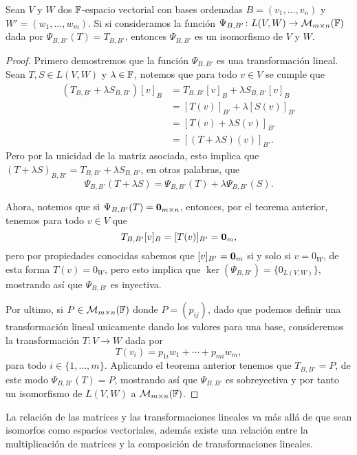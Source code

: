 \begin{teor}\label{teo:isomTrMat}
  Sean $V$ y $W$ dos $\mathbb{F}$-espacio vectorial con bases ordenadas $B = (v_1,\ldots,v_n)$ y $W' = (w_1,\ldots,w_m)$. Si si consideramos la función $\Psi_{B,B'}\colon L(V,W) \to \mathcal{M}_{m\times n}(\mathbb{F})$ dada por $\Psi_{B,B'}(T) = T_{B,B'}$, entonces $\Psi_{B,B'}$ es un isomorfismo de $V$ y $W$.
\end{teor}
\begin{proof}
  Primero demostremos que la función $\Psi_{B,B'}$ es una transformación lineal. Sean $T, S \in L(V,W)$ y $\lambda \in \mathbb{F}$, notemos que para todo $v \in V$ se cumple que
  \begin{align*}
    (T_{B,B'} + \lambda S_{B,B'})[v]_B &= T_{B,B'}[v]_B + \lambda S_{B,B'} [v]_B \\
      &= [T(v)]_{B'} + \lambda [S(v)]_{B'} \\
      &= [T(v) + \lambda S(v)]_{B'} \\
      &= [ (T + \lambda S)(v)]_{B'}.
  \end{align*}
  Pero por la unicidad de la matriz asociada, esto implica que $(T + \lambda S)_{B,B'} = T_{B,B'} + \lambda S_{B,B'}$, en otras palabras, que
  \[ \Psi_{B,B'}(T + \lambda S) = \Psi_{B,B'}(T) + \lambda \Psi_{B,B'}(S). \]

  Ahora, notemos que si $\Psi_{B,B'}(T) = \mathbf{0}_{m\times n}$, entonces, por el teorema anterior, tenemos para todo $v \in V$ que  
    \[ T_{B,B'}[v]_B  = [T(v)]_{B'} = \mathbf{0}_m,\]
  pero por propiedades conocidas sabemos que $[v]_{B'} = \mathbf{0}_m$ si y solo si $v = 0_W$, de esta forma $T(v) = 0_W$, pero esto implica que $\ker(\Psi_{B,B'}) = \{  0_{L(V,W)} \}$, mostrando así que $\Psi_{B,B'}$ es inyectiva.

  Por ultimo, si $P \in \mathcal{M}_{m\times n}(\mathbb{F})$ donde $P = (p_{ij})$, dado que podemos definir una transformación lineal unicamente dando los valores para una base, consideremos la transformación $T\colon V \to W$ dada por
  \[ T(v_i) =  p_{1i}w_1 + \cdots + p_{mi}w_m, \]
  para todo $i \in \{1,\ldots,m\}$. Aplicando el teorema anterior tenemos que $T_{B,B'} = P$, de este modo $\Psi_{B,B'}(T) = P$, mostrando así que $\Psi_{B,B'}$ es sobreyectiva y por tanto un isomorfismo de $L(V,W)$ a $\mathcal{M}_{m\times n}(\mathbb{F})$.
\end{proof}

La relación de las matrices y las transformaciones lineales va más allá de que sean isomorfos como espacios vectoriales, además existe una relación entre la multiplicación de matrices y la composición de transformaciones lineales.

